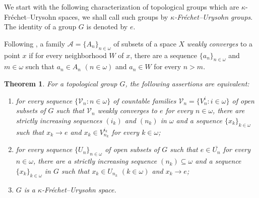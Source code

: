 \documentclass[preprint,11pt]{elsarticle}
\newtheorem{theorem}{Theorem}[section]
\theoremstyle{definition}
\theoremstyle{remark}
\numberwithin{equation}{section}
\numberwithin{theorem}{section}
\newcommand{\w}{\omega}
\newcommand{\AAA}{\mathcal{A}}
\begin{document}

We start with the following characterization of topological groups which are $\kappa$-Fr\'{e}chet--Urysohn spaces, we shall call such groups by {\em  $\kappa$-Fr\'{e}chet--Urysohn groups}. The identity of a group $G$ is denoted by $e$.

Following  \cite{Osipov-23}, a family $\AAA=\{A_n\}_{n\in\w}$ of subsets of a space $X$ {\em weakly converges} to a point $x$ if for every neighborhood $W$ of $x$, there are a sequence $\{a_n\}_{n\in\w}$ and $m\in\w$ such that $a_n\in A_n$ $(n\in\w)$ and $a_n\in W$ for every $n>m$.


\begin{theorem} \label{t:kFU-group-charac}
For a topological group $G$, the following assertions are equivalent:
\begin{enumerate}
\item[{\rm(i)}] for every sequence $\{\mathcal{V}_n: n\in \w\}$ of countable families $\mathcal{V}_n=\{V^i_n: i\in \w\}$ of open subsets of $G$ such that $\mathcal{V}_n$ weakly converges to $e$ for every $n\in\w$, there are strictly increasing sequences  $(i_k)$ and $(n_k)$ in $\w$ and a sequence $\{x_k\}_{k\in\w}$ such that $x_k\to e$ and $x_k\in V^{i_k}_{n_k}$ for every $k\in\w$;
\item[{\rm(ii)}] for every sequence $\{U_n\}_{n\in\w}$ of open subsets of $G$ such that $e\in \overline{U_n}$ for every $n\in\w$, there are a strictly increasing sequence $(n_k)\subseteq \w$ and a sequence $\{x_k\}_{k\in\w}$ in $G$ such that $x_k\in U_{n_k}$ $(k\in\w)$ and $x_k\to e$;
\item[{\rm(iii)}] $G$ is a $\kappa$-Fr\'{e}chet--Urysohn space.
\end{enumerate}
\end{theorem}
\end{document}
